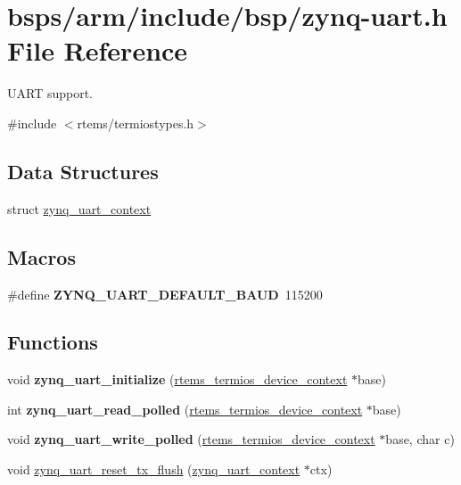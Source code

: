 \hypertarget{zynq-uart_8h}{}\section{bsps/arm/include/bsp/zynq-\/uart.h File Reference}
\label{zynq-uart_8h}


U\+A\+RT support.  


{\ttfamily \#include $<$rtems/termiostypes.\+h$>$}\newline
\subsection*{Data Structures}
\begin{DoxyCompactItemize}
\item 
struct \mbox{\hyperlink{structzynq__uart__context}{zynq\+\_\+uart\+\_\+context}}
\end{DoxyCompactItemize}
\subsection*{Macros}
\begin{DoxyCompactItemize}
\item 
\mbox{\label{zynq-uart_8h_ad92739962c05c6b204ed1bd847e5edd6}} 
\#define {\bfseries Z\+Y\+N\+Q\+\_\+\+U\+A\+R\+T\+\_\+\+D\+E\+F\+A\+U\+L\+T\+\_\+\+B\+A\+UD}~115200
\end{DoxyCompactItemize}
\subsection*{Functions}
\begin{DoxyCompactItemize}
\item 
\mbox{\label{zynq-uart_8h_a42106d30f087834c4f5afc73316d3998}} 
void {\bfseries zynq\+\_\+uart\+\_\+initialize} (\mbox{\hyperlink{structrtems__termios__device__context}{rtems\+\_\+termios\+\_\+device\+\_\+context}} $\ast$base)
\item 
\mbox{\label{zynq-uart_8h_af1498d4952cb7243e2dd0e51bca2b1a2}} 
int {\bfseries zynq\+\_\+uart\+\_\+read\+\_\+polled} (\mbox{\hyperlink{structrtems__termios__device__context}{rtems\+\_\+termios\+\_\+device\+\_\+context}} $\ast$base)
\item 
\mbox{\label{zynq-uart_8h_ae50b9a08c6431ae6b895827af4c55526}} 
void {\bfseries zynq\+\_\+uart\+\_\+write\+\_\+polled} (\mbox{\hyperlink{structrtems__termios__device__context}{rtems\+\_\+termios\+\_\+device\+\_\+context}} $\ast$base, char c)
\item 
void \mbox{\hyperlink{zynq-uart_8h_a39e4bfc6412d92131bc4b3a086709141}{zynq\+\_\+uart\+\_\+reset\+\_\+tx\+\_\+flush}} (\mbox{\hyperlink{structzynq__uart__context}{zynq\+\_\+uart\+\_\+context}} $\ast$ctx)
\end{DoxyCompactItemize}
